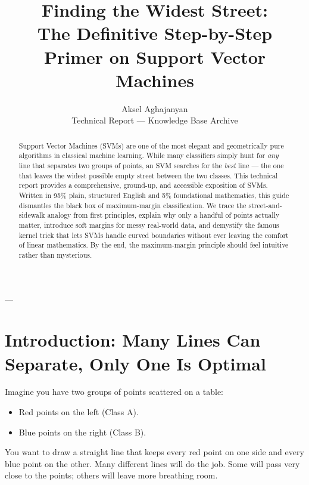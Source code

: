 \documentclass[11pt,journal,onecolumn]{IEEEtran}
\begin{document}
\title{Finding the Widest Street: \\ The Definitive Step-by-Step Primer on Support Vector Machines}

\author{Aksel Aghajanyan \\ \small Technical Report --- Knowledge Base Archive}

\maketitle

\begin{abstract}
Support Vector Machines (SVMs) are one of the most elegant and geometrically pure algorithms in classical machine learning. While many classifiers simply hunt for \textit{any} line that separates two groups of points, an SVM searches for the \textit{best} line --- the one that leaves the widest possible empty street between the two classes. This technical report provides a comprehensive, ground-up, and accessible exposition of SVMs. Written in 95\% plain, structured English and 5\% foundational mathematics, this guide dismantles the black box of maximum-margin classification. We trace the street-and-sidewalk analogy from first principles, explain why only a handful of points actually matter, introduce soft margins for messy real-world data, and demystify the famous kernel trick that lets SVMs handle curved boundaries without ever leaving the comfort of linear mathematics. By the end, the maximum-margin principle should feel intuitive rather than mysterious.
\end{abstract}

---

\section{Introduction: Many Lines Can Separate, Only One Is Optimal}
\label{sec:intro}

Imagine you have two groups of points scattered on a table:
\begin{itemize}
    \item Red points on the left (Class A).
    \item Blue points on the right (Class B).
\end{itemize}

You want to draw a straight line that keeps every red point on one side and every blue point on the other. Many different lines will do the job. Some will pass very close to the points; others will leave more breathing room.
\end{document}
